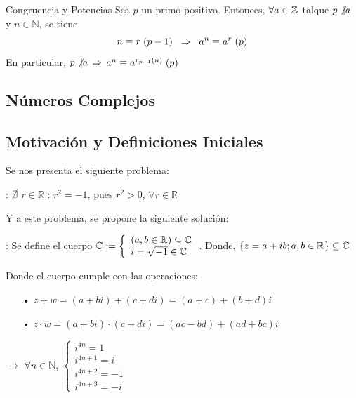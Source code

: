 \documentclass[10pt]{article}
\begin{document}
\begin{cor}{Congruencia y Potencias}
Sea $p$ un primo positivo. Entonces, $\forall a \in \entero{}$ talque $p \not\vert a$ y $n \in \mathbb{N}$, se tiene
\[\congruente{n}{r}{p-1} \es{0.2} \implica \es{0.2} \congruente{a^n}{a^r}{p}\]
En particular, $p \not\vert a$ $\implica$ $\congruente{a^n}{a^{r_{p-1}(n)}}{p}$
\end{cor}

\begin{center}
\section{Números Complejos} 
\subsection{Motivación y Definiciones Iniciales}
\end{center}
Se nos presenta el siguiente problema:

\vspace{0.2cm}

: $\cancel{\exists}$ $r \in \mathbb{R}$ : $r^2 = -1$, pues $r^2 > 0$, $\forall r \in \mathbb{R}$  

\vspace{0.2cm}

Y a este problema, se propone la siguiente solución:

\vspace{0.2cm}

: Se define el cuerpo $\mathbb{C}:= \left\lbrace \begin{array}{l}
(a, b \in \real{}) \contenido \mathbb{C}\\
i = \sqrt{-1} \in \mathbb{C}
\end{array} \right.$. Donde, $\lbrace z = a + ib ; a, b \in \real{} \rbrace \contenido \mathbb{C}$ 

Donde el cuerpo cumple con las operaciones: 
\begin{itemize}
\item[•] $ z+w = (a+bi) + (c+di) = (a+c) + (b+d)i$ 
\item[•] $z \cdot w = (a+bi) \cdot (c+di) = (ac-bd) + (ad + bc)i$
\end{itemize}

 $\rightarrow$ $\forall n \in \mathbb{N}$, $\left\lbrace \begin{array}{l}
i^{4n} = 1 \\
i^{4n+1} = i \\
i^{4n+2} = -1 \\
i^{4n + 3} = -i  
\end{array}\right.$
\end{document}
